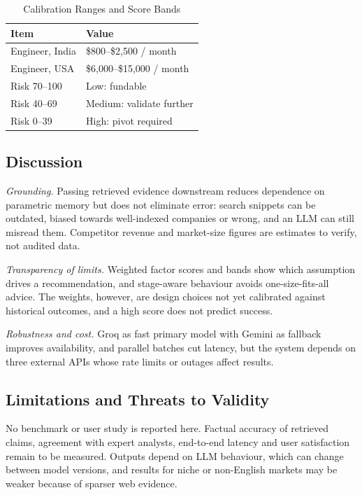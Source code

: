 \begin{table}[!t]
\caption{Calibration Ranges and Score Bands}
\centering\footnotesize
\begin{tabular}{@{}ll@{}}\toprule
\textbf{Item} & \textbf{Value}\\\midrule
Engineer, India & \$800--\$2,500 / month\\
Engineer, USA & \$6,000--\$15,000 / month\\
Risk 70--100 & Low: fundable\\
Risk 40--69 & Medium: validate further\\
Risk 0--39 & High: pivot required\\\bottomrule
\end{tabular}
\end{table}

\subsection{Discussion}
\textit{Grounding.} Passing retrieved evidence downstream reduces dependence on parametric memory but does not eliminate error: search snippets can be outdated, biased towards well-indexed companies or wrong, and an LLM can still misread them. Competitor revenue and market-size figures are estimates to verify, not audited data.

\textit{Transparency of limits.} Weighted factor scores and bands show which assumption drives a recommendation, and stage-aware behaviour avoids one-size-fits-all advice. The weights, however, are design choices not yet calibrated against historical outcomes, and a high score does not predict success.

\textit{Robustness and cost.} Groq as fast primary model with Gemini as fallback improves availability, and parallel batches cut latency, but the system depends on three external APIs whose rate limits or outages affect results.

\subsection{Limitations and Threats to Validity}
No benchmark or user study is reported here. Factual accuracy of retrieved claims, agreement with expert analysts, end-to-end latency and user satisfaction remain to be measured. Outputs depend on LLM behaviour, which can change between model versions, and results for niche or non-English markets may be weaker because of sparser web evidence.

